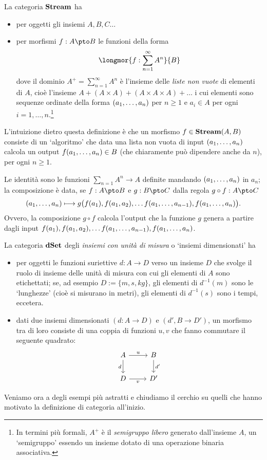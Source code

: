 \begin{example}\label{example_streams}
	La categoria \(\mathbf{Stream}\) ha
	\begin{itemize}
		\item per oggetti gli insiemi \(A,B,C\dots\)
		\item per morfismi \(f : A\pto B\) le funzioni della forma
		      \[\longmor{f : \sum_{n=1}^\infty A^n}{B}\]
		      dove il dominio \(A^+=\sum_{n=1}^\infty A^n\) è l'insieme delle \emph{liste non vuote} di elementi di \(A\), cioè l'insieme \(A + (A\times A) + (A\times A\times A) + \dots\) i cui elementi sono sequenze ordinate della forma \((\tup an,)\) per \(n\ge 1\) e \(a_i\in A\) per ogni \(i=1,\dots,n\).\footnote{In termini più formali, \(A^+\) è il \emph{semigruppo libero} generato dall'insieme \(A\), un `semigruppo' essendo un insieme dotato di una operazione binaria associativa.}
	\end{itemize}
	L'intuizione dietro questa definizione è che un morfismo \(f \in \mathbf{Stream}(A,B)\) consiste di un `algoritmo' che data una lista non vuota di input \((\tup an,)\) calcola un output \(f(\tup an,)\in B\) (che chiaramente può dipendere anche da \(n\)), per ogni \(n\ge 1\).

	Le identità sono le funzioni \(\sum_{n=1} A^n\to A\) definite mandando \((\tup an,)\) in \(a_n\); la composizione è data, se \(f : A\pto B\) e \(g : B\pto C\) dalla regola \(g\circ f : A\pto C\)
	\[(\tup an,)\longmapsto g\big(f(a_1),f(a_1,a_2),\dots f(\tup a{n-1},),f(\tup an,)\big).\]
	Ovvero, la composizione \(g\circ f\) calcola l'output che la funzione \(g\) genera a partire dagli input \(f(a_1),f(a_1,a_2),\dots f(\tup a{n-1},),f(\tup an,)\).
\end{example}
\begin{example}\label{example_dimensionati}
	La categoria \(\mathbf{dSet}\) degli \emph{insiemi con unità di misura} o `insiemi dimensionati' ha
	\begin{itemize}
		\item per oggetti le funzioni suriettive \(d : A\to D\) verso un insieme \(D\) che svolge il ruolo di insieme delle unità di misura con cui gli elementi di \(A\) sono etichettati; se, ad esempio \(D := \{m,s,kg\}\), gli elementi di \(d^{-1}(m)\) sono le `lunghezze' (cioè si misurano in metri), gli elementi di \(d^{-1}(s)\) sono i tempi, eccetera.
		\item dati due insiemi dimensionati \((d : A\to D)\) e \((d', B\to D')\), un morfismo tra di loro consiste di una coppia di funzioni \(u,v\) che fanno commutare il seguente quadrato:
		      \[\begin{tikzcd}
				      A\ar[r, "u"]\ar[d,"d"'] & B \ar[d, "d'"]\\
				      D \ar[r, "v"']& D'
			      \end{tikzcd}\]
	\end{itemize}
\end{example}
Veniamo ora a degli esempi più astratti e chiudiamo il cerchio su quelli che hanno motivato la definizione di categoria all'inizio.

